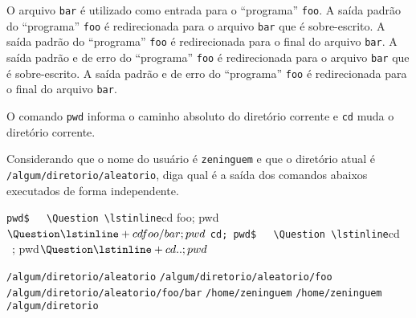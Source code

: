 \begin{Answer}[ref={0025}]
  \Question O arquivo \lstinline+bar+ é utilizado como entrada para o
  ``programa'' \lstinline+foo+.
  \Question A saída padrão do ``programa'' \lstinline+foo+ é redirecionada para
  o arquivo \lstinline+bar+ que é sobre-escrito.
  \Question A saída padrão do ``programa'' \lstinline+foo+ é redirecionada para
  o final do arquivo \lstinline+bar+.
  \Question A saída padrão e de erro do ``programa'' \lstinline+foo+ é
  redirecionada para o arquivo \lstinline+bar+ que é sobre-escrito.
  \Question A saída padrão e de erro do ``programa'' \lstinline+foo+ é
  redirecionada para o final do arquivo \lstinline+bar+.
\end{Answer}

\begin{Exercise}[label={0026}, difficulty={0}, origin={bash}]
  O comando \lstinline+pwd+ informa o caminho absoluto do diretório corrente e
  \lstinline+cd+ muda o diretório corrente.

  Considerando que o nome do usuário é \lstinline+zeninguem+ e que o diretório
  atual é \lstinline+/algum/diretorio/aleatorio+, diga qual é a saída dos
  comandos abaixos executados de forma independente.

  \Question \lstinline+pwd$
  \Question \lstinline+cd foo; pwd$
  \Question \lstinline+cd foo/bar; pwd$
  \Question \lstinline+cd; pwd$
  \Question \lstinline+cd ~; pwd$
  \Question \lstinline+cd ..; pwd$
\end{Exercise}
\begin{Answer}[ref={0026}]
  \Question \lstinline+/algum/diretorio/aleatorio+
  \Question \lstinline+/algum/diretorio/aleatorio/foo+
  \Question \lstinline+/algum/diretorio/aleatorio/foo/bar+
  \Question \lstinline+/home/zeninguem+
  \Question \lstinline+/home/zeninguem+
  \Question \lstinline+/algum/diretorio+
\end{Answer}

